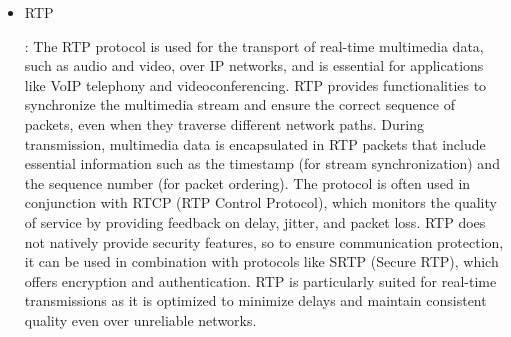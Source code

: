 \documentclass[english]{article}
\begin{document}
\begin{itemize}
	\item \hypertarget{RTP}{RTP}:
	      The RTP protocol is used for the transport of real-time multimedia data,
	      such as audio and video, over IP networks, and is essential for applications
	      like VoIP telephony and videoconferencing. RTP provides functionalities to
	      synchronize the multimedia stream and ensure the correct sequence of packets,
	      even when they traverse different network paths. During transmission,
	      multimedia data is encapsulated in RTP packets that include essential
	      information such as the timestamp (for stream synchronization) and the
	      sequence number (for packet ordering). The protocol is often used in
	      conjunction with RTCP (RTP Control Protocol), which monitors the quality
	      of service by providing feedback on delay, jitter, and packet loss.
	      RTP does not natively provide security features, so to ensure communication
	      protection, it can be used in combination with protocols like SRTP (Secure RTP),
	      which offers encryption and authentication. RTP is particularly suited for real-time
	      transmissions as it is optimized to minimize delays and maintain consistent quality
	      even over unreliable networks.


\end{itemize}
\end{document}
